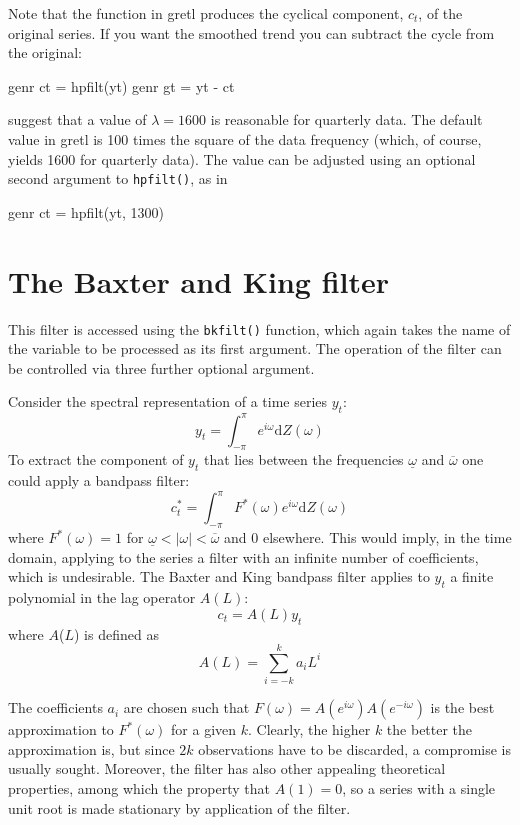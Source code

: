 Note that the  function in gretl produces the
cyclical component, $c_t$, of the original series.  If you want the
smoothed trend you can subtract the cycle from the original:

\begin{code}
genr ct = hpfilt(yt)
genr gt = yt - ct
\end{code}

\cite{hodrick97} suggest that a value of $\lambda = 1600$ is reasonable
for quarterly data.  The default value in gretl is 100 times the
square of the data frequency (which, of course, yields 1600 for
quarterly data).  The value can be adjusted using an optional
second argument to \verb+hpfilt()+, as in
%
\begin{code}
genr ct = hpfilt(yt, 1300)
\end{code}

\section{The Baxter and King filter}
\label{sec:baxter-king}

This filter is accessed using the \verb+bkfilt()+ function, which
again takes the name of the variable to be processed as its first
argument. The operation of the filter can be controlled via three
further optional argument.

Consider the spectral representation of a time series $y_t$:
%       
\[ y_t = \int_{-\pi}^{\pi} e^{i\omega} \mathrm{d} Z(\omega) \]
%
To extract the component of $y_t$ that lies between the frequencies
$\underline{\omega}$ and $\overline{\omega}$ one could apply a
bandpass filter:
%       
\[ c^*_t = \int_{-\pi}^{\pi} F^*(\omega) e^{i\omega} \mathrm{d}
Z(\omega) \]
%
where $F^*(\omega) = 1$ for $\underline{\omega} < |\omega| <
\overline{\omega}$ and 0 elsewhere. This would imply, in the time
domain, applying to the series a filter with an infinite number of
coefficients, which is undesirable. The Baxter and King bandpass
filter applies to $y_t$ a finite polynomial in the lag
operator $A(L)$:
%       
\[ c_t = A(L) y_t \]
%
where $A$($L$) is defined as
%       
\[ A(L) = \sum_{i=-k}^{k} a_i L^i \]

The coefficients $a_i$ are chosen such that $F(\omega)
= A(e^{i\omega})A(e^{-i\omega})$ is the best approximation to
$F^*(\omega)$ for a given $k$. Clearly, the higher $k$ the better the
approximation is, but since $2k$ observations have to be discarded, a
compromise is usually sought. Moreover, the filter has also other
appealing theoretical properties, among which the property that $A(1)
= 0$, so a series with a single unit root is made stationary by
application of the filter.

